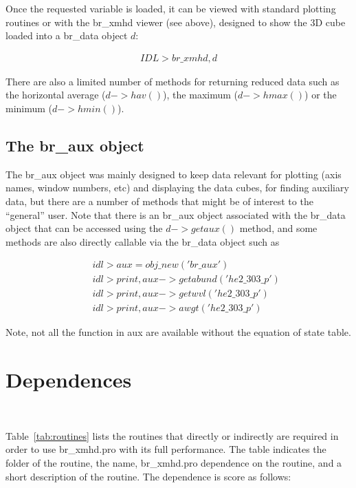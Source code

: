 \documentclass[12pt,preprint]{aastex}
\begin{document}
Once the requested variable is loaded, it can be viewed with standard plotting 
routines or with the br\_xmhd viewer (see above), designed to show the 3D cube loaded 
into a br\_data object $d$:

\begin{eqnarray}
IDL> br\_xmhd,d
\end{eqnarray}

There are also a limited 
number of methods for returning reduced data such as the horizontal average ($d->hav()$), 
the maximum ($d->hmax()$) or the minimum ($d->hmin()$). 

\subsection{The br\_aux object}

The br\_aux object was mainly designed to keep data relevant for plotting (axis names, window numbers, 
etc) and displaying the data cubes, for finding auxiliary data, but there are a number of methods 
that might be of interest to the ``general'' user. Note that there is an br\_aux object associated 
with the br\_data object that can be accessed using the 
$d->getaux()$ method, and some methods are also directly callable via the br\_data object such as

\begin{eqnarray}
&& idl> aux=obj\_new('br\_aux') \nonumber\\
&& idl> print,aux->getabund('he2\_303\_p')\nonumber\\
&& idl> print,aux->getwvl('he2\_303\_p')\nonumber\\
&& idl> print,aux->awgt('he2\_303\_p')   \nonumber
\end{eqnarray}

Note, not all the function in aux are available without the equation of state table.

\section{Dependences}~\label{sec:dep}

Table~\ref{tab:routines} lists the routines that directly or indirectly are required in order to 
use br\_xmhd.pro with its full performance. The table indicates the folder of the 
routine, the name, br\_xmhd.pro dependence on the routine, and a short description 
of the routine. The dependence is score as follows:
\end{document}
